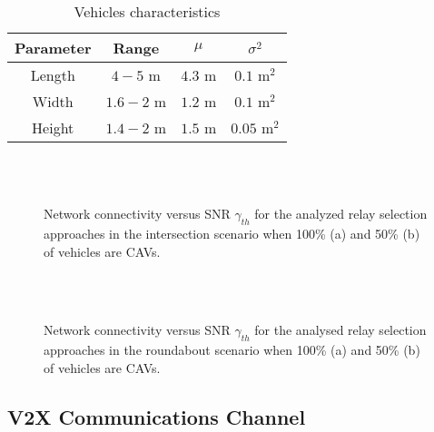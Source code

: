 \documentclass[journal]{IEEEtran}
\begin{document}
\begin{table}[t] 
\centering
\caption{Vehicles characteristics}
\begin{tabular}{ | c | c | c | c |}
	\hline
	\textbf{Parameter}  & Range & {$\mu$} & {$\sigma^2$}\\ \hline\hline
	Length & $4-5$ m & $4.3$ m & $0.1$ m$^2$ \\ 
	Width & $1.6-2$ m & $1.2$ m & $0.1$ m$^2$ \\ 
	Height & $1.4-2$ m & $1.5$ m & $0.05$ m$^2$ \\ \hline\hline
	\end{tabular}
\label{tab:vehicleparameters}
\end{table}


\begin{figure}[!t] 
\centering
{}\\
\\

\caption{Network connectivity versus SNR $\gamma_{th}$ for the analyzed relay selection approaches in the intersection scenario when 100\% (a) and 50\% (b) of vehicles are CAVs.}
\label{fig:connect_int}
\end{figure}

\begin{figure}[!t] 
\centering
{}\\
\\

\caption{Network connectivity versus SNR $\gamma_{th}$ for the analysed relay selection approaches in the roundabout scenario when 100\% (a) and 50\% (b) of vehicles are CAVs.}
\label{fig:connect_rou}
\end{figure}

\subsection{V2X Communications Channel}
\end{document}
